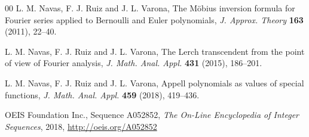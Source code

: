 \documentclass[11pt,a4paper]{amsart}
\theoremstyle{plain}
\theoremstyle{plain}
\theoremstyle{plain}
\theoremstyle{remark}
\begin{document}
\begin{thebibliography}{00}
L. M. Navas, F. J. Ruiz and J. L. Varona,
The M\"obius inversion formula for Fourier series applied to Bernoulli and Euler polynomials,
\textit{J. Approx. Theory}
\textbf{163} (2011), 22--40.



L. M. Navas, F. J. Ruiz and J. L. Varona,
The Lerch transcendent from the point of view of Fourier analysis,
\textit{J. Math. Anal. Appl.}
\textbf{431} (2015), 186--201.

L. M. Navas, F. J. Ruiz and J. L. Varona,
Appell polynomials as values of special functions,
\textit{J. Math. Anal. Appl.}
\textbf{459} (2018), 419--436.

OEIS Foundation Inc., 
Sequence A052852,
\textit{The On-Line Encyclopedia of Integer Sequences}, 2018,
\url{http://oeis.org/A052852}

\end{thebibliography}


\end{document}
